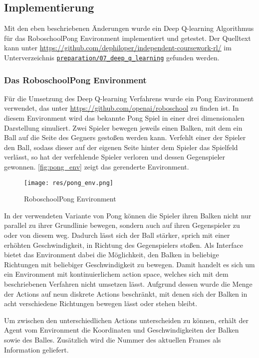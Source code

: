 \documentclass[11pt]{scrartcl}
\begin{document}
\subsection{Implementierung}
Mit den eben beschriebenen Änderungen wurde ein Deep Q-learning Algorithmus für das
RoboschoolPong Environment implementiert und getestet. Der Quelltext kann unter
\url{https://github.com/dephiloper/independent-coursework-rl/} im Unterverzeichnis
\href{https://github.com/dephiloper/independent-coursework-rl/tree/master/preparation/07_deep_q_learning}
{\nolinkurl{preparation/07\_deep\_q\_learning}} gefunden werden.


\subsubsection{Das RoboschoolPong Environment}
Für die Umsetzung des Deep Q-learning Verfahrens wurde ein Pong Environment verwendet, das
unter \url{https://github.com/openai/roboschool} zu finden ist. In diesem Environment wird
das bekannte Pong Spiel in einer drei dimensionalen Darstellung simuliert. Zwei Spieler
bewegen jeweils einen Balken, mit dem ein Ball auf die Seite des Gegners gestoßen werden
kann. Verfehlt einer der Spieler den Ball, sodass dieser auf der eigenen Seite hinter dem
Spieler das Spielfeld verlässt, so hat der verfehlende Spieler verloren und dessen
Gegenspieler gewonnen. \autoref{fig:pong_env} zeigt das gerenderte Environment.

\begin{figure}[htp]
\centering
\texttt{[image: res/pong\_env.png]}
\caption{RoboschoolPong Environment}
\label{fig:pong_env}
\end{figure}
\noindent
In der verwendeten Variante von Pong können die Spieler ihren Balken nicht nur parallel zu
ihrer Grundlinie bewegen, sondern auch auf ihren Gegenspieler zu oder von diesem weg.
Dadurch lässt sich der Ball stärker, sprich mit einer erhöhten Geschwindigkeit, in Richtung
des Gegenspielers stoßen. Als Interface bietet das Environment dabei die Möglichkeit, den
Balken in beliebige Richtungen mit beliebiger Geschwindigkeit zu bewegen. Damit handelt es
sich um ein Environment mit kontinuierlichem action space, welches sich mit dem
beschriebenen Verfahren nicht umsetzen lässt. Aufgrund dessen wurde die Menge der Actions auf
neun diskrete Actions beschränkt, mit denen sich der Balken in acht verschiedene Richtungen
bewegen lässt oder stehen bleibt.

Um zwischen den unterschiedlichen Actions unterscheiden zu können, erhält der Agent vom
Environment die Koordinaten und Geschwindigkeiten der Balken sowie des Balles. Zusätzlich
wird die Nummer des aktuellen Frames als Information geliefert.
\end{document}
